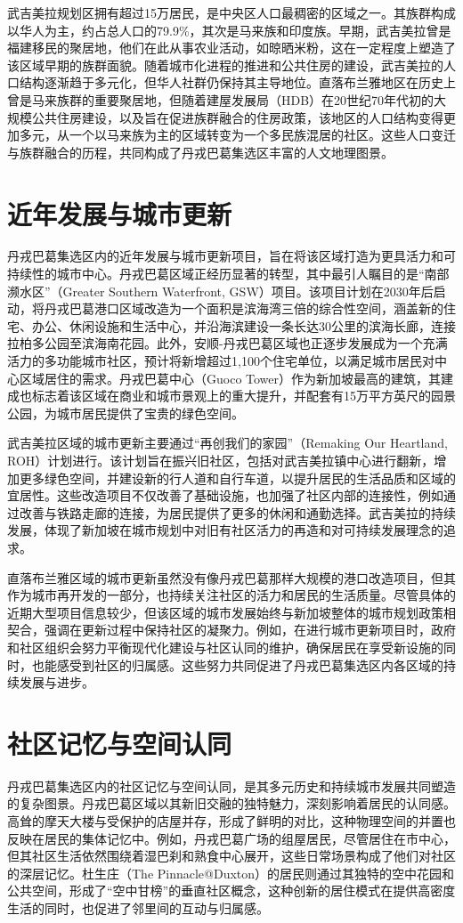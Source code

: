 \documentclass[11pt,a4paper,twoside,openany]{book}
\begin{document}
武吉美拉规划区拥有超过15万居民，是中央区人口最稠密的区域之一。其族群构成以华人为主，约占总人口的79.9\%，其次是马来族和印度族。早期，武吉美拉曾是福建移民的聚居地，他们在此从事农业活动，如晾晒米粉，这在一定程度上塑造了该区域早期的族群面貌。随着城市化进程的推进和公共住房的建设，武吉美拉的人口结构逐渐趋于多元化，但华人社群仍保持其主导地位。直落布兰雅地区在历史上曾是马来族群的重要聚居地，但随着建屋发展局（HDB）在20世纪70年代初的大规模公共住房建设，以及旨在促进族群融合的住房政策，该地区的人口结构变得更加多元，从一个以马来族为主的区域转变为一个多民族混居的社区。这些人口变迁与族群融合的历程，共同构成了丹戎巴葛集选区丰富的人文地理图景。

\section{近年发展与城市更新}
丹戎巴葛集选区内的近年发展与城市更新项目，旨在将该区域打造为更具活力和可持续性的城市中心。丹戎巴葛区域正经历显著的转型，其中最引人瞩目的是“南部濒水区”（Greater Southern Waterfront, GSW）项目。该项目计划在2030年后启动，将丹戎巴葛港口区域改造为一个面积是滨海湾三倍的综合性空间，涵盖新的住宅、办公、休闲设施和生活中心，并沿海滨建设一条长达30公里的滨海长廊，连接拉柏多公园至滨海南花园。此外，安顺-丹戎巴葛区域也正逐步发展成为一个充满活力的多功能城市社区，预计将新增超过1,100个住宅单位，以满足城市居民对中心区域居住的需求。丹戎巴葛中心（Guoco Tower）作为新加坡最高的建筑，其建成也标志着该区域在商业和城市景观上的重大提升，并配套有15万平方英尺的园景公园，为城市居民提供了宝贵的绿色空间。

武吉美拉区域的城市更新主要通过“再创我们的家园”（Remaking Our Heartland, ROH）计划进行。该计划旨在振兴旧社区，包括对武吉美拉镇中心进行翻新，增加更多绿色空间，并建设新的行人道和自行车道，以提升居民的生活品质和区域的宜居性。这些改造项目不仅改善了基础设施，也加强了社区内部的连接性，例如通过改善与铁路走廊的连接，为居民提供了更多的休闲和通勤选择。武吉美拉的持续发展，体现了新加坡在城市规划中对旧有社区活力的再造和对可持续发展理念的追求。

直落布兰雅区域的城市更新虽然没有像丹戎巴葛那样大规模的港口改造项目，但其作为城市再开发的一部分，也持续关注社区的活力和居民的生活质量。尽管具体的近期大型项目信息较少，但该区域的城市发展始终与新加坡整体的城市规划政策相契合，强调在更新过程中保持社区的凝聚力。例如，在进行城市更新项目时，政府和社区组织会努力平衡现代化建设与社区认同的维护，确保居民在享受新设施的同时，也能感受到社区的归属感。这些努力共同促进了丹戎巴葛集选区内各区域的持续发展与进步。

\section{社区记忆与空间认同}
丹戎巴葛集选区内的社区记忆与空间认同，是其多元历史和持续城市发展共同塑造的复杂图景。丹戎巴葛区域以其新旧交融的独特魅力，深刻影响着居民的认同感。高耸的摩天大楼与受保护的店屋并存，形成了鲜明的对比，这种物理空间的并置也反映在居民的集体记忆中。例如，丹戎巴葛广场的组屋居民，尽管居住在市中心，但其社区生活依然围绕着湿巴刹和熟食中心展开，这些日常场景构成了他们对社区的深层记忆。杜生庄（The Pinnacle@Duxton）的居民则通过其独特的空中花园和公共空间，形成了“空中甘榜”的垂直社区概念，这种创新的居住模式在提供高密度生活的同时，也促进了邻里间的互动与归属感。
\end{document}
